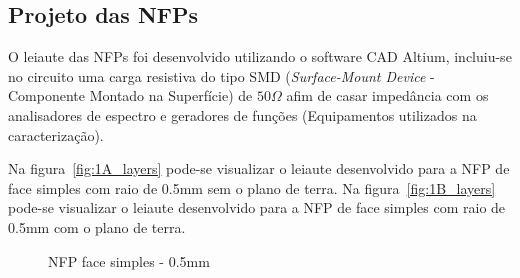 \subsection{Projeto das NFPs}
O leiaute das NFPs foi desenvolvido utilizando o software CAD Altium\textregistered, incluiu-se no circuito uma carga resistiva do tipo SMD (\textit{Surface-Mount Device} - Componente Montado na Superfície) de $50\Omega$ afim de casar impedância com os analisadores de espectro e geradores de funções (Equipamentos utilizados na caracterização).

Na figura~\ref{fig:1A_layers} pode-se visualizar o leiaute desenvolvido para a NFP de face simples com raio de 0.5mm sem o plano de terra. Na figura~\ref{fig:1B_layers} pode-se visualizar o leiaute desenvolvido para a NFP de face simples com raio de 0.5mm com o plano de terra.
\begin{figure}[htb!]
	\centering
 	\caption{NFP face simples - 0.5mm}
	\subfloat[][FS05CT]{
}
\end{figure}
